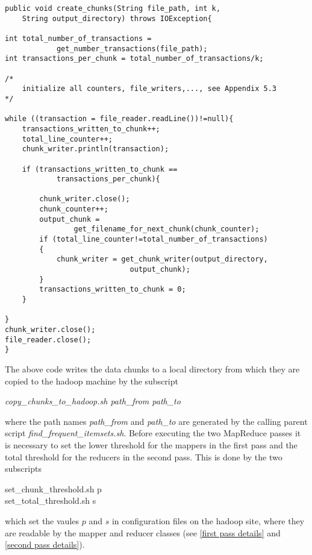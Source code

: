 \begin{lstlisting}[caption={writing the data chunks},captionpos=b,label={lst:create chunks}]
public void create_chunks(String file_path, int k,
	String output_directory) throws IOException{
	
int total_number_of_transactions =
			get_number_transactions(file_path);
int transactions_per_chunk = total_number_of_transactions/k;
	
/*
	initialize all counters, file_writers,..., see Appendix 5.3
*/

while ((transaction = file_reader.readLine())!=null){
	transactions_written_to_chunk++;
	total_line_counter++;
	chunk_writer.println(transaction);
			
	if (transactions_written_to_chunk == 
			transactions_per_chunk){
			
		chunk_writer.close();
		chunk_counter++;
		output_chunk = 
				get_filename_for_next_chunk(chunk_counter);			
		if (total_line_counter!=total_number_of_transactions)
		{
			chunk_writer = get_chunk_writer(output_directory,
							 output_chunk);
		}
		transactions_written_to_chunk = 0;
	}
		
}
chunk_writer.close();
file_reader.close();	
}
\end{lstlisting}

The above code writes the data chunks to a local directory from which they are copied to the hadoop machine by the subscript
\begin{center}
\textit{copy\_chunks\_to\_hadoop.sh path\_from path\_to}
\end{center} 
where the path names \textit{path\_from} and \textit{path\_to} are generated by the calling parent script
\textit{find\_frequent\_itemsets.sh}. Before executing the two MapReduce passes it is necessary to set the lower threshold for the mappers in the first pass and the total threshold for the reducers in the second pass. This is done by the two subscripts
\begin{center}
set\_chunk\_threshold.sh p\\
set\_total\_threshold.sh s
\end{center}
which set the vaules $p$ and $s$ in configuration files on the hadoop site, where they are readable by the mapper and reducer classes (see \ref{first pass details} and \ref{second pass details}).

